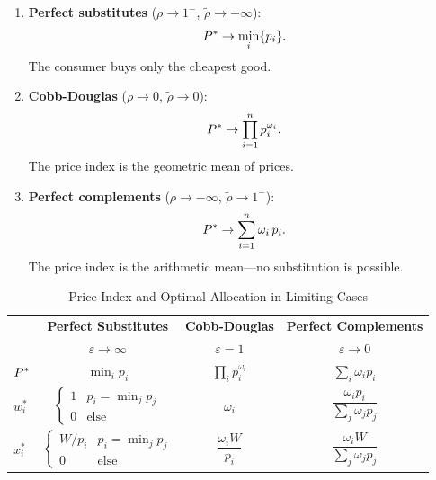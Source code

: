 \begin{proposition}
\label{prop:limiting-price}
\begin{enumerate}[label=(\roman*)]
\item \textbf{Perfect substitutes} ($\rho \to 1^-$, $\tilde{\rho} \to -\infty$):
\begin{equation}
P^{*} \to \min_i \{p_i\}.
\end{equation}
The consumer buys only the cheapest good.

\item \textbf{Cobb-Douglas} ($\rho \to 0$, $\tilde{\rho} \to 0$):
\begin{equation}
P^{*} \to \prod_{i=1}^{n} p_i^{\omega_i}.
\end{equation}
The price index is the geometric mean of prices.

\item \textbf{Perfect complements} ($\rho \to -\infty$, $\tilde{\rho} \to 1^-$):
\begin{equation}
P^{*} \to \sum_{i=1}^{n} \omega_i \, p_i.
\end{equation}
The price index is the arithmetic mean---no substitution is possible.
\end{enumerate}
\end{proposition}

\begin{table}[H]
\centering
\caption{Price Index and Optimal Allocation in Limiting Cases}
\label{tab:limiting-cases}
\renewcommand{\arraystretch}{1.4}
\begin{tabular}{@{}lccc@{}}
\toprule
& \textbf{Perfect Substitutes} & \textbf{Cobb-Douglas} & \textbf{Perfect Complements} \\
& $\varepsilon \to \infty$ & $\varepsilon = 1$ & $\varepsilon \to 0$ \\
\midrule
$P^{*}$ & $\min_i p_i$ & $\prod_i p_i^{\omega_i}$ & $\sum_i \omega_i p_i$ \\[6pt]
$w_i^*$ & $\begin{cases} 1 & p_i = \min_j p_j \\ 0 & \text{else} \end{cases}$ & $\omega_i$ & $\dfrac{\omega_i p_i}{\sum_j \omega_j p_j}$ \\[16pt]
$x_i^*$ & $\begin{cases} W/p_i & p_i = \min_j p_j \\ 0 & \text{else} \end{cases}$ & $\dfrac{\omega_i W}{p_i}$ & $\dfrac{\omega_i W}{\sum_j \omega_j p_j}$ \\[12pt]
\bottomrule
\end{tabular}
\end{table}

